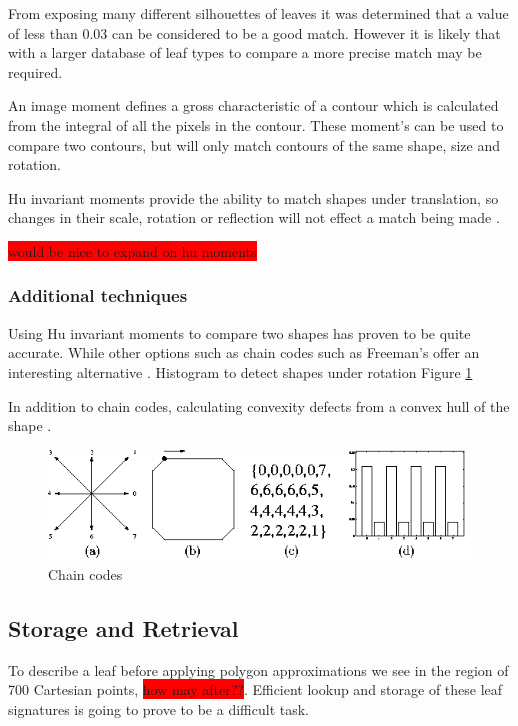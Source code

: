 From exposing many different silhouettes of leaves it was determined that a value of less than 0.03 can be considered to be a good match. However it is likely that with a larger database of leaf types to compare a more precise match may be required.

An image moment defines a gross characteristic of a contour which is calculated from the integral of all the pixels in the contour. These moment’s can be used to compare two contours, but will only match contours of the same shape, size and rotation.

Hu invariant moments provide the ability to match shapes under translation, so changes in their scale, rotation or reflection will not effect a match being made \cite{shutler02, rizon06}.

\colorbox{red}{would be nice to expand on hu moments}

\subsubsection{Additional techniques}
Using Hu invariant moments to compare two shapes has proven to be quite accurate. While other options such as chain codes such as Freeman’s offer an interesting alternative \cite{park05}. Histogram to detect shapes under rotation Figure \ref{chain_codes}


In addition to chain codes, calculating convexity defects from a convex hull of the shape \cite{iivarinen97}. 

\begin{figure}[h!]
\centering
    \includegraphics[width=.7\textwidth]{leaf_identification/images/chain_codes.png}
    \caption{Chain codes}%
    \label{chain_codes}
\end{figure}

\subsection{Storage and Retrieval}
To describe a leaf before applying polygon approximations we see in the region of 700 Cartesian points, \colorbox{red}{how may after??}. Efficient lookup and storage of these leaf signatures is going to prove to be a difficult task.

